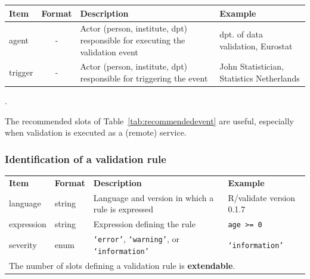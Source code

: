 \documentclass[a4paper, 11pt,titlepage]{article}
\newcommand{\code}[1]{\texttt{#1}}
\begin{document}
\begin{center}
\begin{tabular}{|lp{15mm}p{}p{}|}
\hline
\textbf{Item} & \textbf{Format} & \textbf{Description} &\textbf{Example}\\
\hline
agent   & \multicolumn{1}{c}{-} & Actor (person, institute, dpt) responsible for executing the validation event & dpt. of data validation, Eurostat\\
trigger & \multicolumn{1}{c}{-} & Actor (person, institute, dpt) responsible for triggering the event  & John Statistician, Statistics Netherlands\\
\hline
\end{tabular}
\label{tab:recommendedevent}.
\end{center}
The recommended slots of Table~\ref{tab:recommendedevent} are useful, especially when validation is executed as a (remote) service.


\subsubsection{Identification of a validation rule}
%
\begin{center}
\begin{tabular}{|lp{15mm}p{}p{}|}
\hline
\textbf{Item} & \textbf{Format} & \textbf{Description} &\textbf{Example}\\
language      & string   & Language and version in which a rule is expressed & R/validate version 0.1.7\\
expression    & string   & Expression defining the rule           & \code{age >= 0}\\
severity      & enum     & \code{`error'}, \code{`warning'},
                           or \code{`information'}                & \code{`information'}\\ 

\hline
\multicolumn{4}{|l|}{The number of slots defining a validation rule is \textbf{extendable}.
}\\
\hline
\end{tabular}
\end{center}


\end{document}

